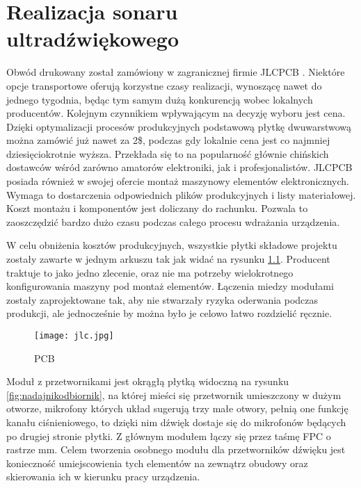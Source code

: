 \chapter[Realizacja sonaru ultradźwiękowego]{Realizacja sonaru ultradźwiękowego}

\label{chapter:realizacja}
Obwód drukowany został zamówiony w zagranicznej firmie JLCPCB \cite{jlcpcb}. Niektóre opcje transportowe oferują korzystne czasy realizacji, 
wynoszącę nawet do jednego tygodnia, będąc tym samym dużą konkurencją wobec lokalnych producentów. Kolejnym czynnikiem 
wpływającym na decyzję wyboru jest cena. Dzięki optymalizacji procesów produkcyjnych podstawową płytkę dwuwarstwową można zamówić już nawet za 2\$, 
podczas gdy lokalnie cena jest co najmniej dziesięciokrotnie wyższa.
Przekłada się to na popularność głównie chińskich dostawców wśród zarówno amatorów elektroniki, jak i profesjonalistów.
JLCPCB posiada również w swojej ofercie montaż maszynowy elementów elektronicznych. Wymaga to dostarczenia odpowiednich plików produkcyjnych i listy materiałowej. 
Koszt montażu i komponentów jest doliczany do rachunku. Pozwala to zaoszczędzić bardzo dużo czasu podczas całego procesu wdrażania urządzenia. 

W celu obniżenia kosztów produkcyjnych, wszystkie płytki składowe projektu zostały zawarte w jednym arkuszu tak jak widać na rysunku \ref{fig:pcb}. Producent traktuje to jako jedno zlecenie, oraz nie ma potrzeby 
wielokrotnego konfigurowania maszyny pod montaż elementów. Łączenia miedzy modułami zostały zaprojektowane tak, aby nie stwarzały ryzyka oderwania podczas produkcji, 
ale jednocześnie by można było je celowo łatwo rozdzielić ręcznie. 

\begin{figure}[ht!]
    \centering
    \texttt{[image: jlc.jpg]}
    \caption{PCB}
    \label{fig:pcb}
\end{figure}

\clearpage
Moduł z przetwornikami jest okrągłą płytką widoczną na rysunku \ref{fig:nadajnikodbiornik}, na której mieści się przetwornik umieszczony w dużym otworze, 
mikrofony których układ sugerują trzy małe otwory, pełnią one funkcję kanału ciśnieniowego, to dzięki nim dźwięk dostaje się do mikrofonów będących po drugiej stronie płytki.
Z głównym modułem łączy się przez taśmę FPC o rastrze \unit[0,5]{mm}. Celem tworzenia osobnego modułu dla przetworników dźwięku jest konieczność umiejscowienia tych elementów 
na zewnątrz obudowy oraz skierowania ich w kierunku pracy urządzenia.

